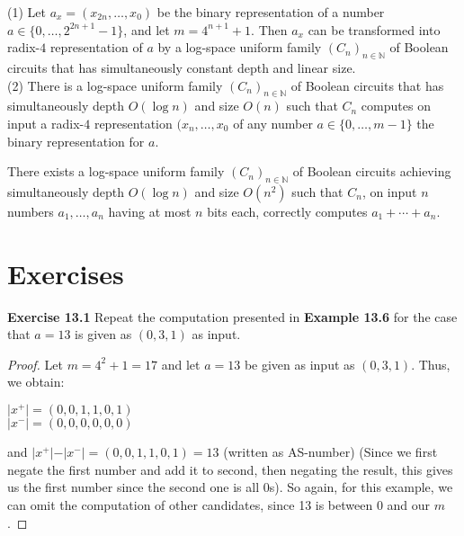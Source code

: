 \documentclass[a4paper]{article}
\begin{document}
\begin{samepage}
\begin{theorem}
(1) Let $a_{x} = (x_{2n}, \ldots, x_{0})$ be the binary representation of a number $a \in \{ 0, \ldots, 2^{2n+1} - 1 \}$, and let $m = 4^{n + 1} + 1$. Then $a_{x}$ can be transformed into radix-$4$ representation of $a$ by a log-space uniform family $(C_{n})_{n \in \mathbb{N}}$ of Boolean circuits that has simultaneously constant depth and linear size. \\
(2) There is a log-space uniform family $(C_{n})_{n \in \mathbb{N}}$ of Boolean circuits that has simultaneously depth $O(\log{n})$ and size $O(n)$ such that $C_{n}$ computes on input a radix-$4$ representation $(x_{n}, \ldots, x_{0}$ of any number $a \in \{ 0, \ldots, m - 1 \}$ the binary representation for $a$.
\end{theorem}
\end{samepage}


\begin{theorem}
There exists a log-space uniform family $(C_{n})_{n \in \mathbb{N}}$ of Boolean circuits achieving simultaneously depth $O(\log{n})$ and size $O(n^{2})$ such that $C_{n}$, on input $n$ numbers $a_{1}, \ldots, a_{n}$ having at most $n$ bits each, correctly computes $a_{1} + \cdots + a_{n}$.
\end{theorem}



\section{Exercises}
\noindent \textbf{Exercise 13.1}  Repeat the computation presented in \textbf{Example 13.6} for the case that $a = 13$ is given as $(0, 3, 1)$ as input.
\begin{proof}
Let $m = 4^{2} + 1 = 17$ and let $a=13$ be given as input as $(0, 3, 1)$.
Thus, we obtain:
\begin{center}
$\vert x^{+} \vert = (0,0,1,1,0,1)$\\
$\vert x^{-} \vert = (0,0,0,0,0,0)$
\end{center}
and $\vert x^{+} \vert - \vert x^{-} \vert =(0,0,1,1,0,1) =13$ (written as AS-number) (Since we first negate the first number and add it to second, then negating the result, this gives us the first number since the second one is all 0s). So again, for this example, we can omit the computation of other candidates, since 13 is between 0 and our $m$.
\end{proof}
\end{document}
